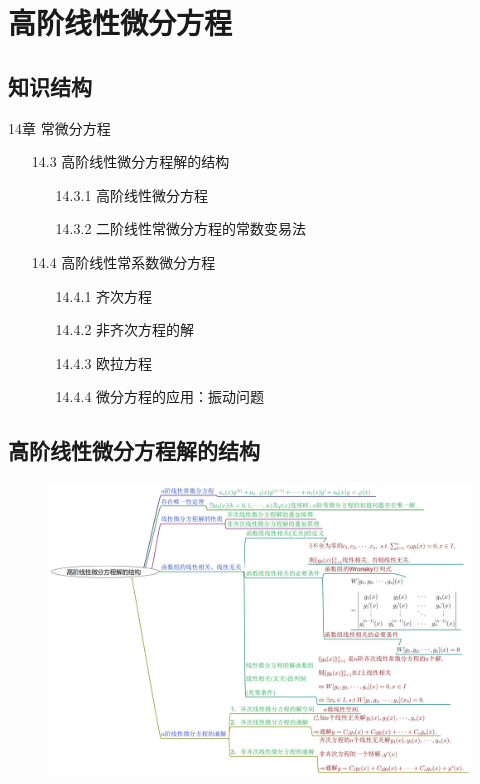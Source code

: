 \documentclass[12pt,UTF8]{ctexart}
\begin{document}
\setcounter{section}{26}
\section{高阶线性微分方程}
\subsection{知识结构}
14章 常微分方程
	\begin{enumerate}
		\item[14.3]高阶线性微分方程解的结构
			\begin{enumerate}
				\item[14.3.1]高阶线性微分方程
				\item[14.3.2]二阶线性常微分方程的常数变易法
			\end{enumerate}
		\item[14.4]高阶线性常系数微分方程
			\begin{enumerate}
				\item[14.4.1]齐次方程
				\item[14.4.2]非齐次方程的解
				\item[14.4.3]欧拉方程
				\item[14.4.4]微分方程的应用：振动问题
			\end{enumerate}
	\end{enumerate}
\subsection{高阶线性微分方程解的结构}
\begin{figure}[H]
\begin{center}
\includegraphics[height=0.5\textheight]{Figures27/Structures.jpg}
\end{center}
\end{figure}
\end{document}
